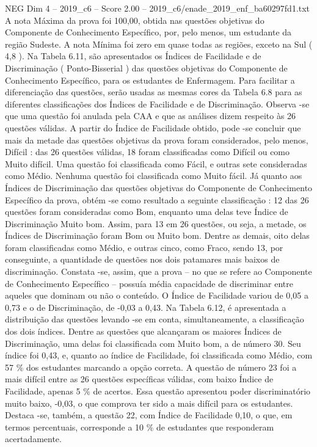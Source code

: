 \begin{textsample}{NEG Dim 4 – 2019\_c6 – Score 2.00 – 2019\_c6/enade\_2019\_enf\_ba60297fd1.txt}
A nota Máxima da prova foi 100,00, obtida nas questões objetivas do Componente de Conhecimento Específico, por, pelo menos, um estudante da região Sudeste.
A nota Mínima foi zero em quase todas as regiões, exceto na Sul ( 4,8 ).
Na Tabela 6.11, são apresentados os Índices de Facilidade e de Discriminação ( Ponto-Bisserial ) das questões objetivas do Componente de Conhecimento Específico, para os estudantes de Enfermagem.
Para facilitar a diferenciação das questões, serão usadas as mesmas cores da Tabela 6.8 para as diferentes classificações dos Índices de Facilidade e de Discriminação.
Observa -se que uma questão foi anulada pela CAA e que as análises dizem respeito às 26 questões válidas.
A partir do Índice de Facilidade obtido, pode -se concluir que mais da metade das questões objetivas da prova foram considerados, pelo menos, Difícil : das 26 questões válidas, 18 foram classificadas como Difícil ou como Muito difícil.
Uma questão foi classificada como Fácil, e outras sete consideradas como Médio.
Nenhuma questão foi classificada como Muito fácil.
Já quanto aos Índices de Discriminação das questões objetivas do Componente de Conhecimento Específico da prova, obtém -se como resultado a seguinte classificação : 12 das 26 questões foram consideradas como Bom, enquanto uma delas teve Índice de Discriminação Muito bom.
Assim, para 13 em 26 questões, ou seja, a metade, os Índices de Discriminação foram Bom ou Muito bom.
Dentre as demais, oito delas foram classificadas como Médio, e outras cinco, como Fraco, sendo 13, por conseguinte, a quantidade de questões nos dois patamares mais baixos de discriminação.
Constata -se, assim, que a prova – no que se refere ao Componente de Conhecimento Específico – possuía média capacidade de discriminar entre aqueles que dominam ou não o conteúdo.
O Índice de Facilidade variou de 0,05 a 0,73 e o de Discriminação, de -0,03 a 0,43.
Na Tabela 6.12, é apresentada a distribuição das questões levando -se em conta, simultaneamente, a classificação dos dois índices.
Dentre as questões que alcançaram os maiores Índices de Discriminação, uma delas foi classificada com Muito bom, a de número 30.
Seu índice foi 0,43, e, quanto ao índice de Facilidade, foi classificada como Médio, com 57 \% dos estudantes marcando a opção correta.
A questão de número 23 foi a mais difícil entre as 26 questões específicas válidas, com baixo Índice de Facilidade, apenas 5 \% de acertos.
Essa questão apresentou poder discriminatório muito baixo, -0,03, o que comprova ter sido a mais difícil para os estudantes.
Destaca -se, também, a questão 22, com Índice de Facilidade 0,10, o que, em termos percentuais, corresponde a 10 \% de estudantes que responderam acertadamente.

\end{textsample}
